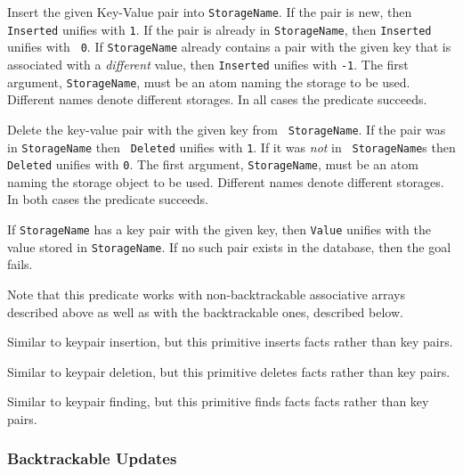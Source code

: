 \begin{description}
Insert the given Key-Value pair into {\tt StorageName}.  If the pair
is new, then {\tt Inserted} unifies with {\tt 1}. If the pair is
already in {\tt StorageName}, then {\tt Inserted} unifies with {\tt
  0}. If {\tt StorageName} already contains a pair with the given key
that is associated with a \emph{different} value, then {\tt Inserted}
unifies with {\tt -1}.  The first argument, {\tt StorageName}, must be
an atom naming the storage to be used. Different names denote
different storages.  In all cases the predicate succeeds.

Delete the key-value pair with the given key from {\tt
  StorageName}. If the pair was in {\tt StorageName} then {\tt
  Deleted} unifies with {\tt 1}.  If it was \emph{not} in {\tt
  StorageName}s then {\tt Deleted} unifies with {\tt 0}.  The first
argument, {\tt StorageName}, must be an atom naming the storage object
to be used. Different names denote different storages.  In both cases
the predicate succeeds.

If {\tt StorageName} has a key pair with the given key, then {\tt Value} unifies
with the value stored in {\tt StorageName}. If no such pair exists in the
database, then the goal fails.

Note that this predicate works with non-backtrackable associative arrays
described above as well as with the backtrackable ones, described below.

Similar to keypair insertion, but this primitive inserts facts rather than
key pairs.

Similar to keypair deletion, but this primitive deletes facts rather than
key pairs.

Similar to keypair finding, but this primitive finds facts facts rather than
key pairs.
\end{description}

\subsubsection{Backtrackable Updates}
\label{backtrackable update}

